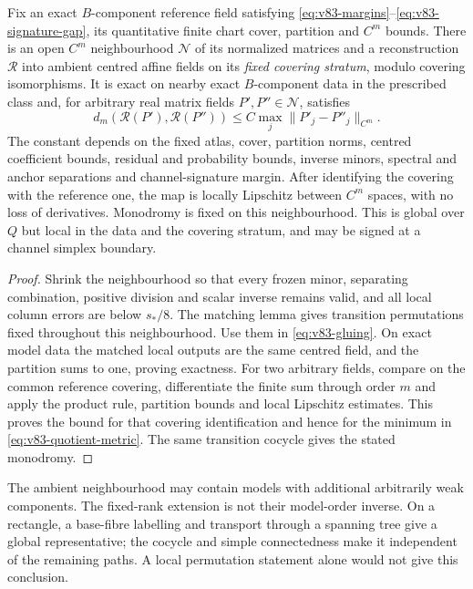 \begin{theorem}
\label{thm:v83-global}
Fix an exact $B$-component reference field satisfying
\eqref{eq:v83-margins}--\eqref{eq:v83-signature-gap}, its quantitative
finite chart cover, partition and $C^m$ bounds. There is an open
$C^m$ neighbourhood $\mathcal N$ of its normalized matrices and a
reconstruction $\mathcal R$ into ambient centred affine fields on its
\emph{fixed covering stratum}, modulo covering isomorphisms. It is
exact on nearby exact $B$-component data in the prescribed class and,
for arbitrary real matrix fields $P',P''\in\mathcal N$, satisfies
\begin{equation}\label{eq:v83-global-estimate}
 d_m(\mathcal R(P'),\mathcal R(P''))
              \le C\max_j\|P'_j-P''_j\|_{C^m}.
\end{equation}
The constant depends on the fixed atlas, cover, partition norms,
centred coefficient bounds, residual and probability bounds, inverse
minors, spectral and anchor separations and channel-signature margin.
After identifying the covering with the reference one, the map is
locally Lipschitz between $C^m$ spaces, with no loss of derivatives.
Monodromy is fixed on this neighbourhood. This is global over $Q$
but local in the data and the covering stratum, and may be signed at
a channel simplex boundary.
\end{theorem}
\begin{proof}
Shrink the neighbourhood so that every frozen minor, separating
combination, positive division and scalar inverse remains valid, and
all local column errors are below $s_*/8$. The matching lemma gives
transition permutations fixed throughout this neighbourhood. Use them
in \eqref{eq:v83-gluing}. On exact model data the matched local outputs
are the same centred field, and the partition sums to one, proving
exactness. For two arbitrary fields, compare on the common reference
covering, differentiate the finite sum through order $m$ and apply
the product rule, partition bounds and local Lipschitz estimates.
This proves the bound for that covering identification and hence for
the minimum in \eqref{eq:v83-quotient-metric}. The same transition
cocycle gives the stated monodromy.
\end{proof}
The ambient neighbourhood may contain models with additional arbitrarily
weak components. The fixed-rank extension is not their model-order
inverse. On a rectangle, a base-fibre labelling and transport through
a spanning tree give a global representative; the cocycle and simple
connectedness make it independent of the remaining paths. A local
permutation statement alone would not give this conclusion.


